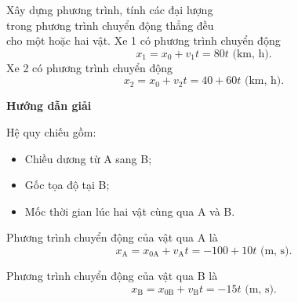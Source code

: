 \begin{dang}{Xây dựng phương trình, tính các đại lượng\\ trong phương trình chuyển động thẳng đều\\ cho một hoặc hai vật.}
{		Xe 1 có phương trình chuyển động
		\begin{equation*}
			x_1=x_0 + v_1t = 80t\textrm{ (km, h)}.
		\end{equation*}
		Xe 2 có phương trình chuyển động  
		\begin{equation*}
			x_2=x_0 + v_2t = 40+60t\textrm{ (km, h)}.
		\end{equation*}
	}
	{	\begin{center}
			\textbf{Hướng dẫn giải}
		\end{center}
		
		
		Hệ quy chiếu gồm:
		\begin{itemize}
			\item Chiều dương từ A sang B;
			\item Gốc tọa độ tại B;
			\item Mốc thời gian lúc hai vật cùng qua A và B.
		\end{itemize}
		
		Phương trình chuyển động của vật qua A là
		\begin{equation*}
			x_\text{A}=x_{0\text{A}} + v_\text{A}t =-100+10t\textrm{ (m, s)}.
		\end{equation*}
		
		Phương trình chuyển động của vật qua B là
		\begin{equation*}
			x_\text{B}=x_{0\text{B}} + v_\text{B}t = -15t\textrm{ (m, s)}.
		\end{equation*}
		
	}
\end{dang}

